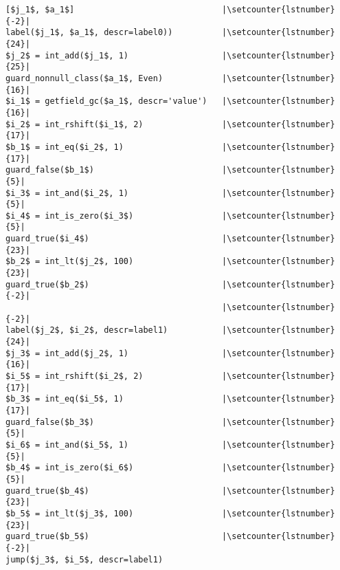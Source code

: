 \begin{lstlisting}[mathescape, numbers=right, escapechar=|, firstnumber=-1]
[$j_1$, $a_1$]                              |\setcounter{lstnumber}{-2}|
label($j_1$, $a_1$, descr=label0))          |\setcounter{lstnumber}{24}|
$j_2$ = int_add($j_1$, 1)                   |\setcounter{lstnumber}{25}|
guard_nonnull_class($a_1$, Even)            |\setcounter{lstnumber}{16}|
$i_1$ = getfield_gc($a_1$, descr='value')   |\setcounter{lstnumber}{16}|
$i_2$ = int_rshift($i_1$, 2)                |\setcounter{lstnumber}{17}|
$b_1$ = int_eq($i_2$, 1)                    |\setcounter{lstnumber}{17}|
guard_false($b_1$)                          |\setcounter{lstnumber}{5}|
$i_3$ = int_and($i_2$, 1)                   |\setcounter{lstnumber}{5}|
$i_4$ = int_is_zero($i_3$)                  |\setcounter{lstnumber}{5}|
guard_true($i_4$)                           |\setcounter{lstnumber}{23}|
$b_2$ = int_lt($j_2$, 100)                  |\setcounter{lstnumber}{23}|
guard_true($b_2$)                           |\setcounter{lstnumber}{-2}|
                                            |\setcounter{lstnumber}{-2}|
label($j_2$, $i_2$, descr=label1)           |\setcounter{lstnumber}{24}|
$j_3$ = int_add($j_2$, 1)                   |\setcounter{lstnumber}{16}|
$i_5$ = int_rshift($i_2$, 2)                |\setcounter{lstnumber}{17}|
$b_3$ = int_eq($i_5$, 1)                    |\setcounter{lstnumber}{17}|
guard_false($b_3$)                          |\setcounter{lstnumber}{5}|
$i_6$ = int_and($i_5$, 1)                   |\setcounter{lstnumber}{5}|
$b_4$ = int_is_zero($i_6$)                  |\setcounter{lstnumber}{5}|
guard_true($b_4$)                           |\setcounter{lstnumber}{23}|
$b_5$ = int_lt($j_3$, 100)                  |\setcounter{lstnumber}{23}|
guard_true($b_5$)                           |\setcounter{lstnumber}{-2}| 
jump($j_3$, $i_5$, descr=label1)
\end{lstlisting}
